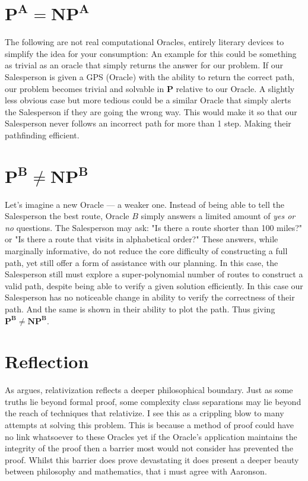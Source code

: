 \documentclass[12pt]{report}
\begin{document}
\section{$\mathbf{P^A = NP^A}$}
The following are not real computational Oracles, entirely literary devices to simplify the idea for your consumption:
An example for this could be something as trivial as an oracle that simply returns the answer for our problem.
If our Salesperson is given a GPS (Oracle) with the ability to return the correct path, our problem becomes trivial and solvable in $\mathbf{P}$ relative to our Oracle.
A slightly less obvious case but more tedious could be a similar Oracle that simply alerts the Salesperson if they are going the wrong way.
This would make it so that our Salesperson never follows an incorrect path for more than 1 step.
Making their pathfinding efficient.

\section{$\mathbf{P^B \neq NP^B}$}
Let's imagine a new Oracle --- a weaker one.
Instead of being able to tell the Salesperson the best route, Oracle $B$ simply answers a limited amount of \textit{yes or no} questions.
The Salesperson may ask: "Is there a route shorter than 100 miles?" or "Is there a route that visits in alphabetical order?"
These answers, while marginally informative, do not reduce the core difficulty of constructing a full path, yet still offer a form of assistance with our planning.
In this case, the Salesperson still must explore a super-polynomial number of routes to construct a valid path, despite being able to verify a given solution efficiently.
In this case our Salesperson has no noticeable change in ability to verify the correctness of their path.
And the same is shown in their ability to plot the path.
Thus giving $\mathbf{P^B \neq NP^B}$.

\section{Reflection}
As \cite{aaronson2005philosophers} argues, relativization reflects a deeper philosophical boundary.
Just as some truths lie beyond formal proof, some complexity class separations may lie beyond the reach of techniques that relativize.
I see this as a crippling blow to many attempts at solving this problem.
This is because a method of proof could have no link whatsoever to these Oracles yet if the Oracle's application maintains the integrity of the proof then a barrier most would not consider has prevented the proof.
Whilst this barrier does prove devastating it does present a deeper beauty between philosophy and mathematics, that i must agree with Aaronson.
\end{document}
